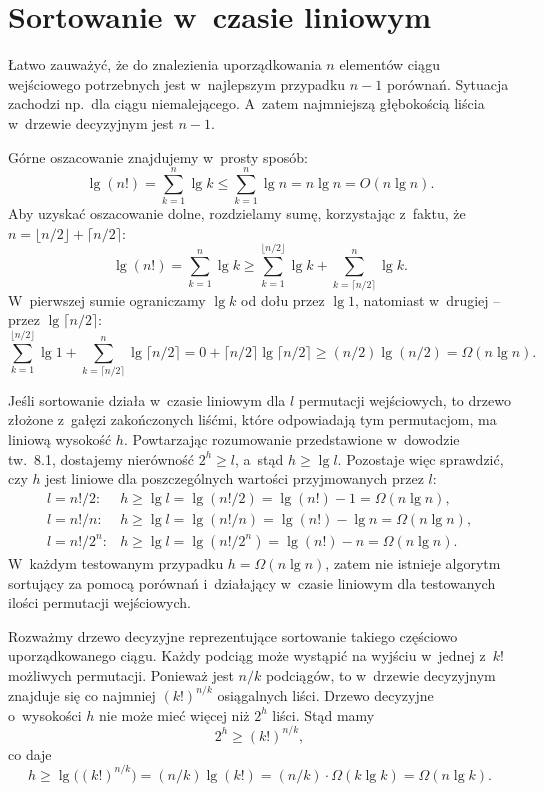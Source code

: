 \chapter{Sortowanie w~czasie liniowym}


\exercise %
Łatwo zauważyć, że do znalezienia uporządkowania $n$ elementów ciągu wejściowego potrzebnych jest w~najlepszym przypadku $n-1$ porównań. Sytuacja zachodzi np.\ dla ciągu niemalejącego. A~zatem najmniejszą głębokością liścia w~drzewie decyzyjnym jest $n-1$.

\exercise %
Górne oszacowanie znajdujemy w~prosty sposób:
\[
	\lg(n!) = \sum_{k=1}^n\lg k \le \sum_{k=1}^n\lg n = n\lg n = O(n\lg n).
\]
Aby uzyskać oszacowanie dolne, rozdzielamy sumę, korzystając z~faktu, że $n=\lfloor n/2\rfloor+\lceil n/2\rceil$:
\[
	\lg(n!) = \sum_{k=1}^n\lg k \ge \sum_{k=1}^{\lfloor n/2\rfloor}\lg k+\sum_{k=\lceil n/2\rceil}^n\lg k.
\]
W~pierwszej sumie ograniczamy $\lg k$ od dołu przez $\lg1$, natomiast w~drugiej -- przez $\lg\lceil n/2\rceil$:
\[
	\sum_{k=1}^{\lfloor n/2\rfloor}\lg1+\sum_{k=\lceil n/2\rceil}^n\lg\lceil n/2\rceil = 0+\lceil n/2\rceil\lg\lceil n/2\rceil \ge (n/2)\lg(n/2) = \Omega(n\lg n).
\]

\exercise %
Jeśli sortowanie działa w~czasie liniowym dla $l$ permutacji wejściowych, to drzewo złożone z~gałęzi zakończonych liśćmi, które odpowiadają tym permutacjom, ma liniową wysokość $h$. Powtarzając rozumowanie przedstawione w~dowodzie tw.~8.1, dostajemy nierówność $2^h\ge l$, a~stąd $h\ge\lg l$. Pozostaje więc sprawdzić, czy $h$ jest liniowe dla poszczególnych wartości przyjmowanych przez $l$:
\[
	\begin{array}{ll}
		l = n!/2: & h \ge \lg l = \lg(n!/2) = \lg(n!)-1 = \Omega(n\lg n), \\[1mm]
		l = n!/n: & h \ge \lg l = \lg(n!/n) = \lg(n!)-\lg n = \Omega(n\lg n), \\[1mm]
		l = n!/2^n: & h \ge \lg l = \lg(n!/2^n) = \lg(n!)-n = \Omega(n\lg n).
	\end{array}
\]
W~każdym testowanym przypadku $h=\Omega(n\lg n)$, zatem nie istnieje algorytm sortujący za pomocą porównań i~działający w~czasie liniowym dla testowanych ilości permutacji wejściowych.

\exercise %
Rozważmy drzewo decyzyjne reprezentujące sortowanie takiego częściowo uporządkowanego ciągu. Każdy podciąg może wystąpić na wyjściu w~jednej z~$k!$ możliwych permutacji. Ponieważ jest $n/k$ podciągów, to w~drzewie decyzyjnym znajduje się co najmniej $(k!)^{n/k}$ osiągalnych liści. Drzewo decyzyjne o~wysokości $h$ nie może mieć więcej niż $2^h$ liści. Stąd mamy
\[
	2^h \ge (k!)^{n/k},
\]
co daje
\[
	h \ge \lg\bigl((k!)^{n/k}\bigr) = (n/k)\lg(k!) = (n/k)\cdot\Omega(k\lg k) = \Omega(n\lg k).
\]

